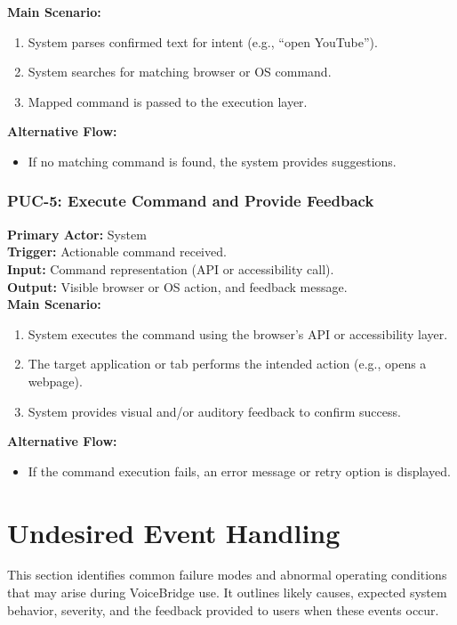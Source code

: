 \documentclass[11pt]{article}
\begin{document}
\textbf{Main Scenario:}
\begin{enumerate}
  \item System parses confirmed text for intent (e.g., “open YouTube”).
  \item System searches for matching browser or OS command.
  \item Mapped command is passed to the execution layer.
\end{enumerate}

\textbf{Alternative Flow:}
\begin{itemize}
  \item If no matching command is found, the system provides suggestions.
\end{itemize}

\bigskip

\subsubsection*{PUC-5: Execute Command and Provide Feedback}
\textbf{Primary Actor:} System \\
\textbf{Trigger:} Actionable command received. \\
\textbf{Input:} Command representation (API or accessibility call). \\
\textbf{Output:} Visible browser or OS action, and feedback message. \\

\textbf{Main Scenario:}
\begin{enumerate}
  \item System executes the command using the browser’s API or accessibility layer.
  \item The target application or tab performs the intended action (e.g., opens a webpage).
  \item System provides visual and/or auditory feedback to confirm success.
\end{enumerate}

\textbf{Alternative Flow:}
\begin{itemize}
  \item If the command execution fails, an error message or retry option is displayed.
\end{itemize}

\bigskip
\section{Undesired Event Handling}
This section identifies common failure modes and abnormal operating conditions that may arise during VoiceBridge use. It outlines likely causes, expected system behavior, severity, and the feedback provided to users when these events occur.
\end{document}
